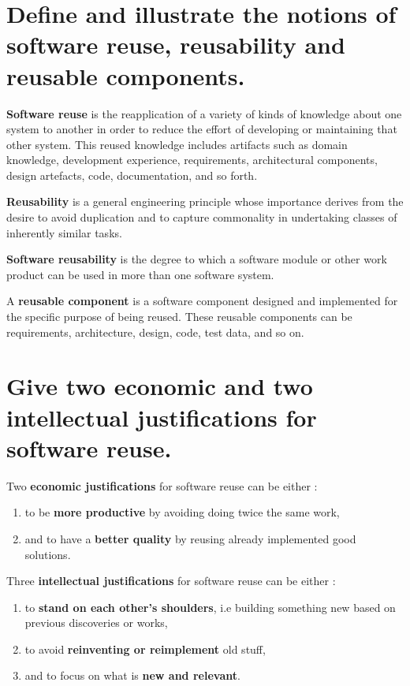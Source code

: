 \section{Define and illustrate the notions of software reuse, reusability and reusable components.}

\textbf{Software reuse} is the reapplication of a variety of kinds of knowledge about one system to another in order to reduce the effort of developing or maintaining that other system. This reused knowledge includes artifacts such as domain knowledge, development experience, requirements, architectural components, design artefacts, code, documentation, and so forth.\newline

\textbf{Reusability} is a general engineering principle whose importance derives from the desire to avoid duplication and to capture commonality in undertaking classes of inherently similar tasks. \newline

\textbf{Software reusability} is the degree to which a software module or other work product can be used in more than one software system.\newline

A \textbf{reusable component} is a software component designed and implemented for the specific purpose of being reused. These reusable components can be requirements, architecture, design, code, test data, and so on.\\


\section{Give two economic and two intellectual justifications for software reuse.}

Two \textbf{economic justifications} for software reuse can be either :
\begin{enumerate}
\item to be \textbf{more productive} by avoiding doing twice the same work,
\item and to have a \textbf{better quality} by reusing already implemented good solutions.\\
\end{enumerate}
Three \textbf{intellectual justifications} for software reuse can be either :
\begin{enumerate}
\item to \textbf{stand on each other's shoulders}, i.e building something new based on previous discoveries or works,
\item  to avoid \textbf{reinventing or reimplement} old stuff,
\item and to focus on what is \textbf{new and relevant}.
\end{enumerate}


